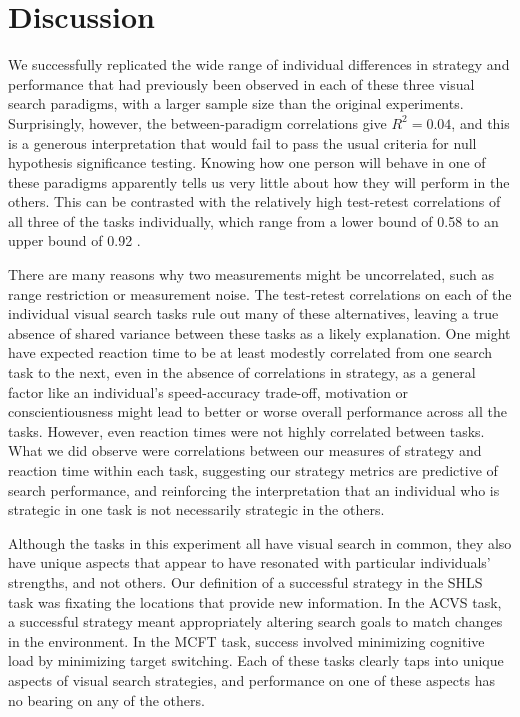 \documentclass[twocolumn]{article}
\begin{document}
\section{Discussion}

We successfully replicated the wide range of individual differences in strategy and performance that had previously been observed in each of these three visual search paradigms, with a larger sample size than the original experiments. Surprisingly, however, the between-paradigm correlations give $R^2 = 0.04$, and this is a generous interpretation that would fail to pass the usual criteria for null hypothesis significance testing. Knowing how one person will behave in one of these paradigms apparently tells us very little about how they will perform in the others. This can be contrasted with the relatively high test-retest correlations of all three of the tasks individually, which range from a lower bound of 0.58 to an upper bound of 0.92 . 

There are many reasons why two measurements might be uncorrelated, such as range restriction or measurement noise. The test-retest correlations on each of the individual visual search tasks rule out many of these alternatives, leaving a true absence of shared variance between these tasks as a likely explanation. One might have expected reaction time to be at least modestly correlated from one search task to the next, even in the absence of correlations in strategy, as a general factor like an individual's speed-accuracy trade-off, motivation or conscientiousness might lead to better or worse overall performance across all the tasks. However, even reaction times were not highly correlated between tasks. What we did observe were correlations between our measures of strategy and reaction time within each task, suggesting our strategy metrics are predictive of search performance, and reinforcing the interpretation that an individual who is strategic in one task is not necessarily strategic in the others. 

Although the tasks in this experiment all have visual search in common, they also have unique aspects that appear to have resonated with particular individuals' strengths, and not others. Our definition of a successful strategy in the SHLS task was fixating the locations that provide new information. In the ACVS task, a successful strategy meant appropriately altering search goals to match changes in the environment. In the MCFT task, success involved minimizing cognitive load by minimizing target switching. Each of these tasks clearly taps into unique aspects of visual search strategies, and performance on one of these aspects has no bearing on any of the others. 
\end{document}
